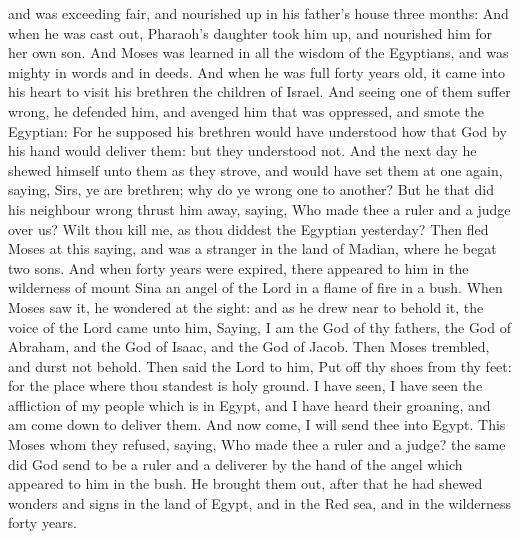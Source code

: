 and was exceeding fair, and nourished up in his father's house three
months:  And when he was cast out, Pharaoh's daughter took
him up, and nourished him for her own son.  And Moses was
learned in all the wisdom of the Egyptians, and was mighty in words and
in deeds.  And when he was full forty years old, it came
into his heart to visit his brethren the children of Israel.
 And seeing one of them suffer wrong, he defended him, and
avenged him that was oppressed, and smote the Egyptian: 
For he supposed his brethren would have understood how that God by his
hand would deliver them: but they understood not.  And the
next day he shewed himself unto them as they strove, and would have set
them at one again, saying, Sirs, ye are brethren; why do ye wrong one to
another?  But he that did his neighbour wrong thrust him
away, saying, Who made thee a ruler and a judge over us? 
Wilt thou kill me, as thou diddest the Egyptian yesterday? 
Then fled Moses at this saying, and was a stranger in the land of
Madian, where he begat two sons.  And when forty years were
expired, there appeared to him in the wilderness of mount Sina an angel
of the Lord in a flame of fire in a bush.  When Moses saw
it, he wondered at the sight: and as he drew near to behold it, the
voice of the Lord came unto him,  Saying, I am the God of
thy fathers, the God of Abraham, and the God of Isaac, and the God of
Jacob. Then Moses trembled, and durst not behold.  Then
said the Lord to him, Put off thy shoes from thy feet: for the place
where thou standest is holy ground.  I have seen, I have
seen the affliction of my people which is in Egypt, and I have heard
their groaning, and am come down to deliver them. And now come, I will
send thee into Egypt.  This Moses whom they refused,
saying, Who made thee a ruler and a judge? the same did God send to be a
ruler and a deliverer by the hand of the angel which appeared to him in
the bush.  He brought them out, after that he had shewed
wonders and signs in the land of Egypt, and in the Red sea, and in the
wilderness forty years.

